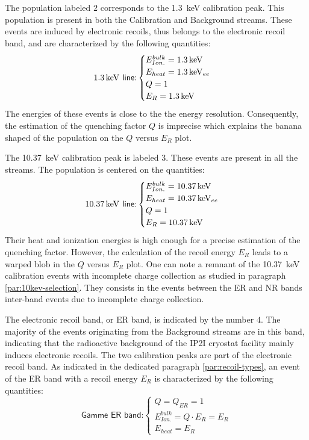 The population labeled $2$ corresponds to the \SI{1.3}{\kilo\eV} calibration peak. This population is present in both the Calibration and Background streams. These events are induced by electronic recoils, thus belongs to the electronic recoil band, and are characterized by the following quantities:
\begin{equation}
\textsf{\SI{1.3}{\kilo\eV} line:}
\begin{cases}
E_{Ion.}^{bulk} = \SI{1.3}{\kilo\eV} \\
E_{heat} = \SI{1.3}{\kilo\eV}_{ee} \\
Q = 1 \\
E_R = \SI{1.3}{\kilo\eV}
\end{cases}
\end{equation}
The energies of these events is close to the the energy resolution. Consequently, the estimation of the quenching factor $Q$ is imprecise which explains the banana shaped of the population on the $Q$ versus $E_R$ plot.

The \SI{10.37}{\kilo\eV} calibration peak is labeled $3$. These events are present in all the streams. The population is centered on the quantities:
\begin{equation}
\textsf{\SI{10.37}{\kilo\eV} line:}
\begin{cases}
E_{Ion.}^{bulk} = \SI{10.37}{\kilo\eV} \\
E_{heat} = \SI{10.37}{\kilo\eV}_{ee} \\
Q = 1 \\
E_R = \SI{10.37}{\kilo\eV}
\end{cases}
\end{equation}
Their heat and ionization energies is high enough for a precise estimation of the quenching factor. However, the calculation of the recoil energy $E_R$ leads to a warped blob in the $Q$ versus $E_R$ plot. 
One can note a remnant of the \SI{10.37}{\kilo\eV} calibration events with incomplete charge collection as studied in paragraph \ref{par:10kev-selection}. They consists in the events between the ER and NR bands inter-band events due to incomplete charge collection.

The electronic recoil band, or ER band, is indicated by the number $4$. The majority of the events originating from the Background streams are in this band, indicating that the radioactive background of the IP2I cryostat facility mainly induces electronic recoils. The two calibration peaks are part of the electronic recoil band. As indicated in the dedicated paragraph \ref{par:recoil-types}, an event of the ER band with a recoil energy $E_R$ is characterized by the following quantities:
\begin{equation}
\label{eq:er-band}
\textsf{Gamme ER band:}
\begin{cases}
Q = Q_{ER} = 1 \\
E_{Ion.}^{bulk} = Q \cdot E_R = E_R \\
E_{heat} = E_R
\end{cases}
\end{equation}

